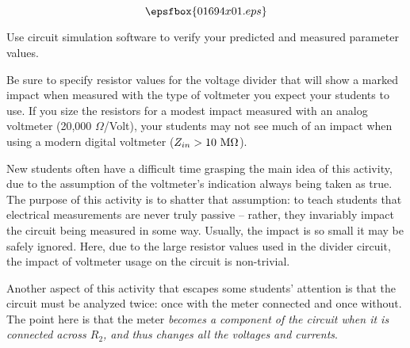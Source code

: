 

$$\epsfbox{01694x01.eps}$$

\vfil \eject






Use circuit simulation software to verify your predicted and measured parameter values.







Be sure to specify resistor values for the voltage divider that will show a marked impact when measured with the type of voltmeter you expect your students to use.  If you size the resistors for a modest impact measured with an analog voltmeter (20,000 $\Omega$/Volt), your students may not see much of an impact when using a modern digital voltmeter ($Z_{in} > 10 \hbox{ M}\Omega$).

New students often have a difficult time grasping the main idea of this activity, due to the assumption of the voltmeter's indication always being taken as true.  The purpose of this activity is to shatter that assumption: to teach students that electrical measurements are never truly passive -- rather, they invariably impact the circuit being measured in some way.  Usually, the impact is so small it may be safely ignored.  Here, due to the large resistor values used in the divider circuit, the impact of voltmeter usage on the circuit is non-trivial.

Another aspect of this activity that escapes some students' attention is that the circuit must be analyzed twice: once with the meter connected and once without.  The point here is that the meter {\it becomes a component of the circuit when it is connected across $R_2$, and thus changes all the voltages and currents}.




